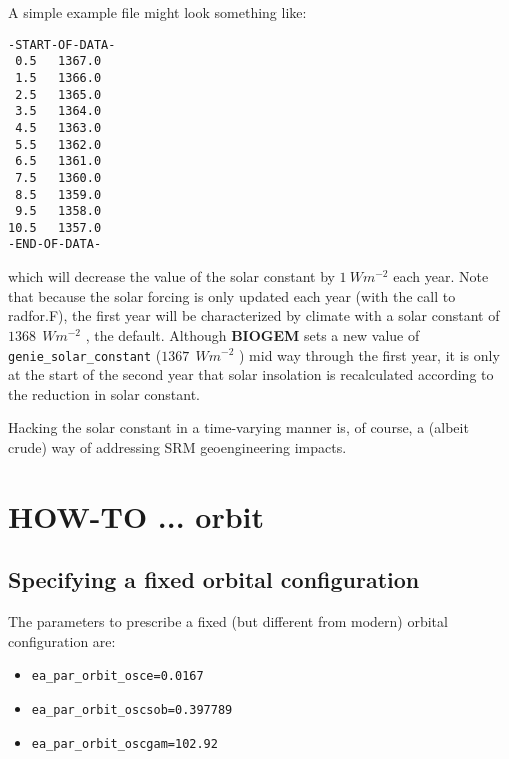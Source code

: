 \documentclass[11pt,fleqn]{book} %
\begin{document}
A simple example file might look something like:
\vspace{-2mm}\small\begin{verbatim}
-START-OF-DATA-
 0.5   1367.0
 1.5   1366.0
 2.5   1365.0
 3.5   1364.0
 4.5   1363.0
 5.5   1362.0
 6.5   1361.0
 7.5   1360.0
 8.5   1359.0
 9.5   1358.0
10.5   1357.0
-END-OF-DATA-
\end{verbatim}\normalsize\vspace{-2mm}
which will decrease the value of the solar constant by \(1 \:W m^{-2}\) each year. Note that because the solar forcing is only updated each year (with the call to \textsf{\footnotesize radfor.F}), the first year will be characterized by climate with a solar constant of \(1368\:\ W m^{-2}\) , the default. Although \textbf{BIOGEM} sets a new value of \texttt{genie\_solar\_constant} (\(1367\:\ W m^{-2}\) ) mid way through the first year, it is only at the start of the second year that solar insolation is recalculated according to the reduction in solar constant.

Hacking the solar constant in a time-varying manner is, of course, a (albeit crude) way of addressing SRM geoengineering impacts.


\newpage


\section{HOW-TO ... orbit}
\vspace{2mm}

%
\subsection*{Specifying a fixed orbital configuration}

The parameters to prescribe a fixed (but different from modern) orbital configuration are:

\vspace{1mm}
\begin{itemize}[noitemsep]
\setlength{\itemindent}{.2in}
\item \small\begin{verbatim}
ea_par_orbit_osce=0.0167
\end{verbatim}\normalsize
\item \small\begin{verbatim}
ea_par_orbit_oscsob=0.397789
\end{verbatim}\normalsize
\item \small\begin{verbatim}
ea_par_orbit_oscgam=102.92
\end{verbatim}\normalsize
\end{itemize}
\vspace{1mm}
\end{document}
